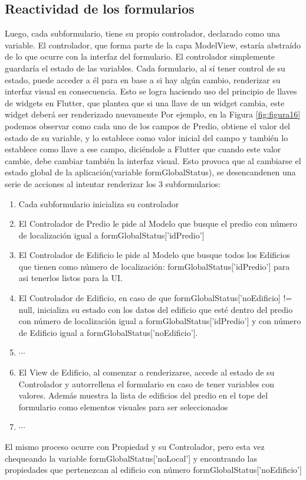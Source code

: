 \subsection{Reactividad de los formularios}
Luego, cada subformulario, tiene su propio controlador, declarado como una variable. El controlador,
que forma parte de la capa ModelView, estaría abstraído de lo que ocurre con la interfaz del formulario. El controlador simplemente guardaría el estado
de las variables. Cada formulario, al sí tener control de su estado, puede acceder a él para en base a si hay algún cambio, renderizar su interfaz visual en consecuencia.
Esto se logra haciendo uso del principio de llaves de widgets en Flutter, que plantea que si una llave de un widget cambia, este widget deberá ser renderizado nuevamente
Por ejemplo, en la Figura \ref{fig:figura16} podemos observar como cada uno de los campos de Predio, obtiene el valor del estado de su variable, y lo establece como
valor inicial del campo y también lo establece como llave a ese campo, diciéndole a Flutter que cuando este valor cambie, debe cambiar también la interfaz visual. Esto provoca que
al cambiarse el estado global de la aplicación(variable formGlobalStatus), se desencandenen una serie de acciones al intentar renderizar los 3 subformularios:
\begin{enumerate}
    \item Cada subformulario inicializa su controlador
    \item El Controlador de Predio le pide al Modelo que busque el predio con número de localización igual a formGlobalStatus['idPredio']
    \item El Controlador de Edificio le pide al Modelo que busque todos los Edificios que tienen como número de localización: formGlobalStatus['idPredio'] para asi tenerlos listos para la UI.
    \item El Controlador de Edificio, en caso de que formGlobalStatus['noEdificio] != null, inicializa su estado con los datos del edificio que esté dentro del predio con número de localización igual a
          formGlobalStatus['idPredio'] y con número de Edificio igual a formGlobalStatus['noEdificio'].
    \item $\cdots$
    \item El View de Edificio, al comenzar a renderizarse, accede al estado de su Controlador y autorrellena el formulario en caso de tener variables con valores. Además muestra la lista de edificios del predio en el tope del formulario como elementos visuales para ser seleccionados
    \item $\cdots$
\end{enumerate}
El mismo proceso ocurre con Propiedad y su Controlador, pero esta vez chequeando la variable formGlobalStatus['noLocal'] y encontrando las propiedades que pertenezcan al edificio con número formGlobalStatus['noEdificio']\\
